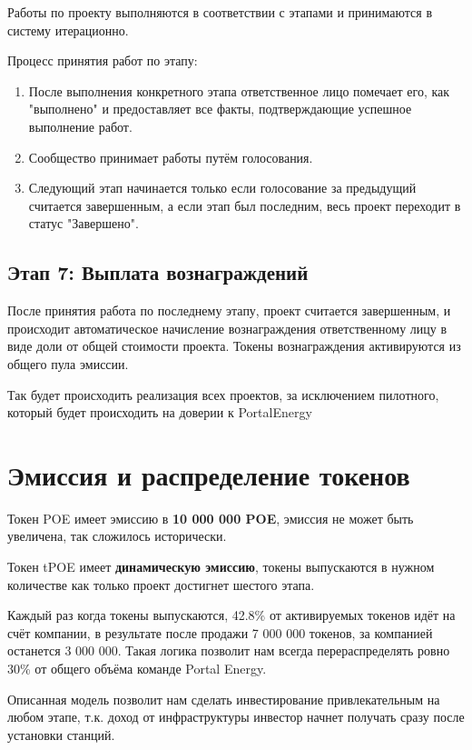 \documentclass[a4paper,12pt]{report}
\begin{document}
	Работы по проекту выполняются в соответствии с этапами и принимаются в систему итерационно. 
	
	Процесс принятия работ по этапу:
	\begin{enumerate}
		\item После выполнения конкретного этапа ответственное лицо помечает его, как "выполнено" и предоставляет все факты, подтверждающие успешное выполнение работ.
	    \item Сообщество принимает работы путём голосования.
	    \item Следующий этап начинается только если голосование за предыдущий считается завершенным, а если этап был последним, весь проект переходит в статус "Завершено".
	\end{enumerate}

\subsection{Этап 7: Выплата вознаграждений}
	После принятия работа по последнему этапу, проект считается завершенным, и происходит автоматическое начисление вознаграждения ответственному лицу в виде доли от общей стоимости проекта. Токены вознаграждения активируются из общего пула эмиссии. 



Так будет происходить реализация всех проектов, за исключением пилотного, который будет происходить на доверии к PortalEnergy 




\section{Эмиссия и распределение токенов}

Токен POE имеет эмиссию в \textbf{10 000 000 POE}, эмиссия не может быть увеличена, так сложилось исторически.
 
Токен tPOE имеет \textbf{динамическую эмиссию}, токены выпускаются в нужном количестве как только проект достигнет шестого этапа.

Каждый раз когда токены выпускаются, 42.8\% от активируемых токенов идёт на счёт компании, в результате после продажи 7 000 000 токенов, за компанией останется 3 000 000. Такая логика позволит нам всегда перераспределять ровно 30\% от общего объёма команде Portal Energy.

Описанная модель позволит нам сделать инвестирование привлекательным на любом этапе, т.к. доход от инфраструктуры инвестор начнет получать сразу после установки станций. 
\end{document}
